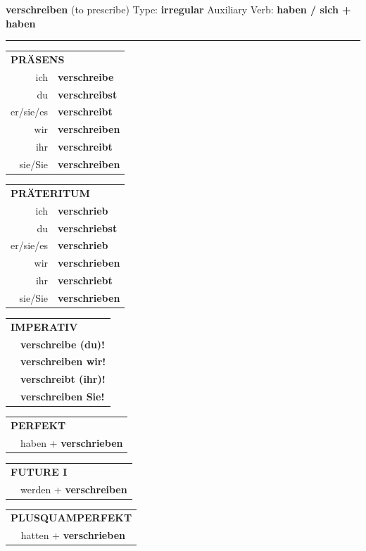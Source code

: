 \documentclass[10pt,a4paper]{revtex4-2}
\begin{document}
\begin{verbbox}
{\Large \bf verschreiben} (to prescribe) \hfill Type: \textbf{irregular} \hfill Auxiliary Verb: \textbf{haben / sich + haben}

\vspace{5pt}
\hrule
\vspace{5pt}

\begin{tabular}{rl}
\multicolumn{2}{l}{\textbf{PRÄSENS}}\\
ich & \textbf{verschreibe}\\
du & \textbf{verschreibst}\\
er/sie/es & \textbf{verschreibt}\\
wir & \textbf{verschreiben}\\
ihr & \textbf{verschreibt}\\
sie/Sie & \textbf{verschreiben}\\
\end{tabular}
\hfill
\begin{tabular}{rl}
\multicolumn{2}{l}{\textbf{PRÄTERITUM}}\\
ich & \textbf{verschrieb}\\
du & \textbf{verschriebst}\\
er/sie/es & \textbf{verschrieb}\\
wir & \textbf{verschrieben}\\
ihr & \textbf{verschriebt}\\
sie/Sie & \textbf{verschrieben}\\
\end{tabular}
\hfill
\begin{tabular}{rl}
\multicolumn{2}{l}{\textbf{IMPERATIV}}\\
& \textbf{verschreibe (du)!}\\
& \textbf{verschreiben wir!}\\
& \textbf{verschreibt (ihr)!}\\
& \textbf{verschreiben Sie!}\\
\end{tabular}

\vspace{10pt}

\begin{tabular}{rl}
\multicolumn{2}{l}{\textbf{PERFEKT}}\\
& haben + \textbf{verschrieben}\\
\end{tabular}
\hfill
\begin{tabular}{rl}
\multicolumn{2}{l}{\textbf{FUTURE I}}\\
& werden + \textbf{verschreiben}\\
\end{tabular}
\hfill
\begin{tabular}{rl}
\multicolumn{2}{l}{\textbf{PLUSQUAMPERFEKT}}\\
& hatten + \textbf{verschrieben}\\
\end{tabular}


\end{verbbox}
\end{document}
